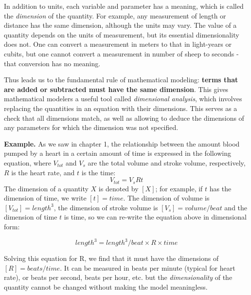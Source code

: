 \documentclass[
]{book}
\theoremstyle{definition}
\theoremstyle{definition}
\theoremstyle{definition}
\theoremstyle{remark}
\begin{document}
In addition to units, each variable and parameter has a meaning, which is called the  \emph{dimension} of the quantity. For example, any measurement of length or distance has the same dimension, although the units may vary. The value of a quantity depends on the units of measurement, but its essential dimensionality does not. One can convert a measurement in meters to that in light-years or cubits, but one cannot convert a measurement in number of sheep to seconds - that conversion has no meaning.

Thus leads us to the fundamental rule of mathematical modeling: \textbf{terms that are added or subtracted must have the same dimension}. This gives mathematical modelers a useful tool called  \emph{dimensional analysis}, which involves replacing the quantities in an equation with their dimensions. This serves as a check that all dimensions match, as well as allowing to deduce the dimensions of any parameters for which the dimension was not specified. \citep{smith_mathematical_1968}

\textbf{Example.} As we saw in chapter 1, the relationship between the amount blood pumped by a heart in a certain amount of time is expressed in the following equation, where \(V_{tot}\) and \(V_s\) are the total volume and stroke volume, respectively, \(R\) is the heart rate, and \(t\) is the time:
\[
V_{tot} = V_sRt
\]
The dimension of a quantity \(X\) is denoted by \([X]\); for example, if \(t\) has the dimension of time, we write \([t] = time\). The dimension of volume is \([V_{tot}] = length^3\), the dimension of stroke volume is \([V_s] = volume/beat\) and the dimension of time \(t\) is time, so we can re-write the equation above in dimensional form:

\[length^3 = length^3/ beat \times R \times time\]

Solving this equation for R, we find that it must have the dimensions of \([R] = beats/time\). It can be measured in beats per minute (typical for heart rate), or beats per second, beats per hour, etc. but the
\emph{dimensionality} of the quantity cannot be changed without making the model meaningless.
\end{document}
